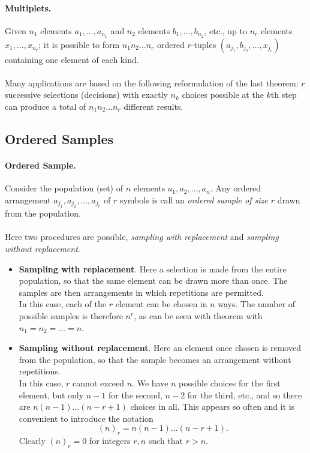 \documentclass{article}
\numberwithin{equation}{subsection}
\begin{document}
			\paragraph{Multiplets.} Given $n_1$ elements $a_1,\dots,a_{n_1}$ and $n_2$ elements $b_1,\dots,b_{n_2}$, etc., up to $n_r$ elements $x_1,\dots,x_{n_r}$; it is possible to form $n_1n_2\dots n_r$ ordered $r$-tuples $(a_{j_1}, b_{j_2}, \dots, x_{j_r})$ containing one element of each kind.
			\paragraph{} Many applications are based on the following reformulation of the last theorem: $r$ successive selections (decisions) with exactly $n_k$ choices possible at the $k$th step can produce a total of $n_1n_2\dots n_r$ different results.
		\subsection{Ordered Samples}
			\paragraph{Ordered Sample. } Consider the population (set) of $n$ elements $a_1, a_2,\dots, a_n$. Any ordered arrangement $a_{j_1}, a_{j_2}, \dots, a_{j_r}$ of $r$ symbols is call an \textit{ordered sample of size $r$} drawn from the population.
			\paragraph{} Here two procedures are possible, \textit{sampling with replacement} and \textit{sampling without replacement}.
			\begin{itemize}
			\item \textbf{Sampling with replacement}. Here a selection is made from the entire population, so that the same element can be drawn more than once. The samples are then arrangements in which repetitions are permitted. \\ In this case, each of the $r$ element can be chosen in $n$ ways. The number of possible samples is therefore $n^r$, as can be seen with theorem with $n_1 = n_2 = \dots = n$.
			\item \textbf{Sampling without replacement}. Here an element once chosen is removed from the population, so that the sample becomes an arrangement without repetitions. \\ In this case, $r$ cannot exceed $n$. We have $n$ possible choices for the first element, but only $n-1$ for the second, $n-2$ for the third, etc., and so there are $n(n-1)\dots (n-r+1)$ choices in all. This appears so often and it is convenient to introduce the notation 
			\begin{equation}
				\label{eq:2.2.1}
				(n)_r = n(n-1)\dots (n-r+1).
			\end{equation}
			Clearly $(n)_r = 0$ for integers $r, n$ such that $r > n$.
			\end{itemize}			
\end{document}
